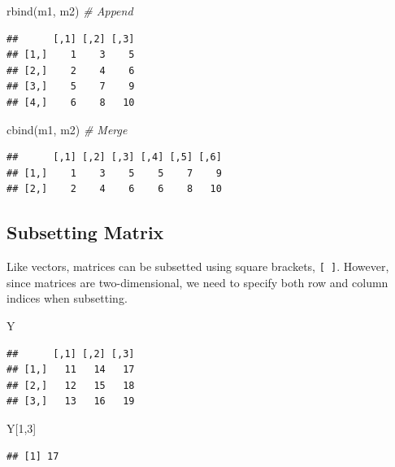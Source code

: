 \documentclass[
]{book}
\newenvironment{Shaded}{\begin{snugshade}}{\end{snugshade}}
\newcommand{\CommentTok}[1]{\textcolor[rgb]{0.56,0.35,0.01}{\textit{#1}}}
\newcommand{\DecValTok}[1]{\textcolor[rgb]{0.00,0.00,0.81}{#1}}
\newcommand{\FunctionTok}[1]{\textcolor[rgb]{0.00,0.00,0.00}{#1}}
\newcommand{\NormalTok}[1]{#1}
\theoremstyle{definition}
\theoremstyle{definition}
\theoremstyle{definition}
\theoremstyle{definition}
\theoremstyle{remark}
\begin{document}
\begin{Shaded}
\begin{Highlighting}[]
\FunctionTok{rbind}\NormalTok{(m1, m2) }\CommentTok{\# Append}
\end{Highlighting}
\end{Shaded}

\begin{verbatim}
##      [,1] [,2] [,3]
## [1,]    1    3    5
## [2,]    2    4    6
## [3,]    5    7    9
## [4,]    6    8   10
\end{verbatim}

\begin{Shaded}
\begin{Highlighting}[]
\FunctionTok{cbind}\NormalTok{(m1, m2) }\CommentTok{\# Merge}
\end{Highlighting}
\end{Shaded}

\begin{verbatim}
##      [,1] [,2] [,3] [,4] [,5] [,6]
## [1,]    1    3    5    5    7    9
## [2,]    2    4    6    6    8   10
\end{verbatim}

\hypertarget{subsetting-matrix}{%
\subsection{Subsetting Matrix}\label{subsetting-matrix}}

Like vectors, matrices can be subsetted using square brackets, \texttt{{[}\ {]}}. However, since matrices are two-dimensional, we need to specify both row and column indices when subsetting.

\begin{Shaded}
\begin{Highlighting}[]
\NormalTok{Y}
\end{Highlighting}
\end{Shaded}

\begin{verbatim}
##      [,1] [,2] [,3]
## [1,]   11   14   17
## [2,]   12   15   18
## [3,]   13   16   19
\end{verbatim}

\begin{Shaded}
\begin{Highlighting}[]
\NormalTok{Y[}\DecValTok{1}\NormalTok{,}\DecValTok{3}\NormalTok{]}
\end{Highlighting}
\end{Shaded}

\begin{verbatim}
## [1] 17
\end{verbatim}
\end{document}
